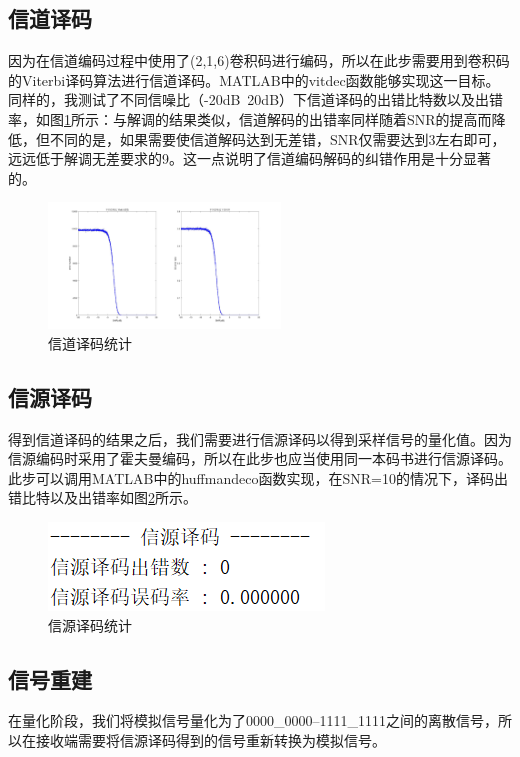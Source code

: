 \documentclass{../source/zju}
\begin{document}
    \subsection{信道译码}
        因为在信道编码过程中使用了(2,1,6)卷积码进行编码，所以在此步需要用到卷积码的Viterbi译码算法进行信道译码。MATLAB中的vitdec函数能够实现这一目标。同样的，我测试了不同信噪比（-20dB~20dB）下信道译码的出错比特数以及出错率，如图\ref{信道解码}所示：与解调的结果类似，信道解码的出错率同样随着SNR的提高而降低，但不同的是，如果需要使信道解码达到无差错，SNR仅需要达到3左右即可，远远低于解调无差要求的9。这一点说明了信道编码解码的纠错作用是十分显著的。
        \begin{figure}[H]
            \centering
            \includegraphics[width = 0.55\textwidth]{figure/信道解码.jpg}
            \caption{信道译码统计}
            \label{信道解码}
        \end{figure}

    \subsection{信源译码}
        得到信道译码的结果之后，我们需要进行信源译码以得到采样信号的量化值。因为信源编码时采用了霍夫曼编码，所以在此步也应当使用同一本码书进行信源译码。此步可以调用MATLAB中的huffmandeco函数实现，在SNR=10的情况下，译码出错比特以及出错率如图\ref{信源译码}所示。
        \begin{figure}[H]
            \centering
            \includegraphics[]{figure/信源译码.png}
            \caption{信源译码统计}
            \label{信源译码}
        \end{figure}

    \subsection{信号重建}
        在量化阶段，我们将模拟信号量化为了0000\_0000--1111\_1111之间的离散信号，所以在接收端需要将信源译码得到的信号重新转换为模拟信号。
\end{document}

